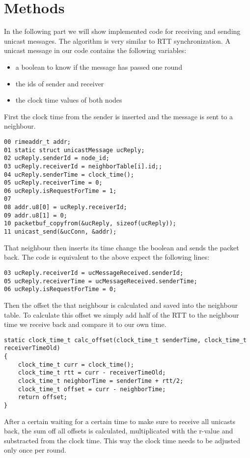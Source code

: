 \documentclass{llncs}
\begin{document}
\section{Methods}
In the following part we will show implemented code for receiving and sending unicast messages. The algorithm is very similar to RTT synchronization. A unicast message in our code contains the following variables:
\begin{itemize}
	\item a boolean to know if the message has passed one round
	\item the ids of sender and receiver
	\item the clock time values of both nodes
\end{itemize}
First the clock time from the sender is inserted and the message is sent to a neighbour. 
\begin{lstlisting}
00 rimeaddr_t addr;
01 static struct unicastMessage ucReply;
02 ucReply.senderId = node_id;
03 ucReply.receiverId = neighborTable[i].id;;
04 ucReply.senderTime = clock_time();
05 ucReply.receiverTime = 0;
06 ucReply.isRequestForTime = 1;
07 
08 addr.u8[0] = ucReply.receiverId;
09 addr.u8[1] = 0;
10 packetbuf_copyfrom(&ucReply, sizeof(ucReply));
11 unicast_send(&ucConn, &addr);
\end{lstlisting}

That neighbour then inserts its time change the boolean and sends the packet back. The code is equivalent to the above expect the following lines:

\begin{lstlisting}
03 ucReply.receiverId = ucMessageReceived.senderId;
05 ucReply.receiverTime = ucMessageReceived.senderTime;
06 ucReply.isRequestForTime = 0;
\end{lstlisting}


 Then the offset the that neighbour is calculated and saved into the neighbour table. To calculate this offset we simply add half of the RTT to the neighbour time we receive back and compare it to our own time. 

\begin{lstlisting}
static clock_time_t calc_offset(clock_time_t senderTime, clock_time_t receiverTimeOld)
{
    clock_time_t curr = clock_time();
    clock_time_t rtt = curr - receiverTimeOld;
    clock_time_t neighborTime = senderTime + rtt/2;
    clock_time_t offset = curr - neighborTime;
    return offset;
}
\end{lstlisting}

After a certain waiting for a certain time to make sure to receive all unicasts back, the sum off all offsets is calculated, multiplicated with the r-value and substracted from the clock time. This way the clock time needs to be adjusted only once per round.
\end{document}
